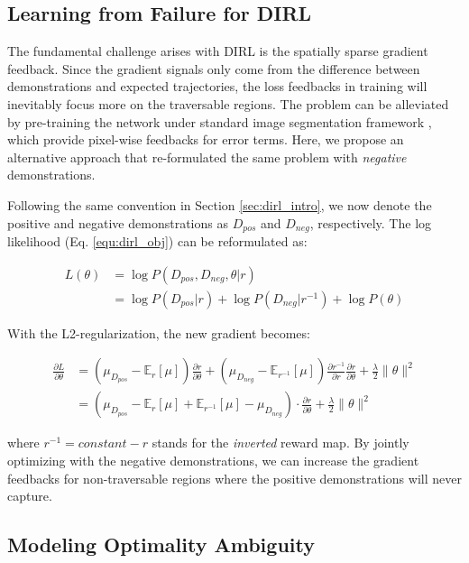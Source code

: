 \documentclass[../thesis.tex]{subfiles}
\begin{document}
\subsection{Learning from Failure for DIRL}
 
The fundamental challenge arises with DIRL is the spatially sparse gradient feedback.
Since the gradient signals only come from the difference between demonstrations and expected trajectories, the loss feedbacks in training will inevitably focus more on the traversable regions.
The problem can be alleviated by pre-training the network under standard image segmentation framework \cite{wulfmeier2016incorporating}, which provide pixel-wise feedbacks for error terms.
Here, we propose an alternative approach that re-formulated the same problem with \textit{negative} demonstrations.
 
Following the same convention in Section \ref{sec:dirl_intro}, we now denote the positive and negative demonstrations as $D_{pos}$ and $D_{neg}$, respectively. The log likelihood (Eq. \ref{equ:dirl_obj}) can be reformulated as:
 
\begin{align}
L(\theta) &= \log P(D_{pos}, D_{neg},\theta|r) \\
&= \log P(D_{pos}|r) + \log P(D_{neg}|r^{-1}) + \log P(\theta)
\end{align}
 
With the L2-regularization, the new gradient becomes:
 
\begin{align}
\frac{\partial L}{\partial \theta} &= \left( \mu_{D_{pos}} - \mathbb{E}_{r}[\mu] \right) \frac{\partial r}{\partial \theta} + \left( \mu_{D_{neg}} - \mathbb{E}_{r^{-1}}[\mu] \right) \frac{\partial r^{-1}}{\partial r} \frac{\partial r}{\partial \theta} + \frac{\lambda}{2} \| \theta \|^2 \\
&= \left( \mu_{D_{pos}} - \mathbb{E}_{r}[\mu] + \mathbb{E}_{r^{-1}}[\mu] - \mu_{D_{neg}} \right) \cdot \frac{\partial r}{\partial \theta} + \frac{\lambda}{2} \| \theta \|^2
\end{align}
 
where $r^{-1} = constant - r $ stands for the \textit{inverted} reward map.
By jointly optimizing with the negative demonstrations, we can increase the gradient feedbacks for non-traversable regions where the positive demonstrations will never capture.
 
\subsection{Modeling Optimality Ambiguity}
 
\end{document}
